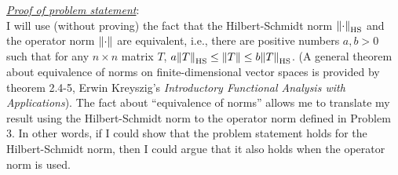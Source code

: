 \documentclass{article}
\begin{document}
























\noindent \underline{\textit{Proof of problem statement}}: \\


I will use (without proving) the fact that the Hilbert-Schmidt norm $\norm{ \cdot }_{\text{HS}}$ and the operator norm $\norm{\cdot}$ are equivalent, i.e., there are positive numbers $a,b> 0$ such that for any $n\times n$ matrix $T$, $a\norm{T}_{\text{HS}} \leq \norm{T} \leq b\norm{T}_{\text{HS}}$. (A general theorem about equivalence of norms on finite-dimensional vector spaces is provided by theorem 2.4-5, Erwin Kreyszig's \textit{Introductory Functional Analysis with Applications}). The fact about ``equivalence of norms'' allows me to translate my result using the Hilbert-Schmidt norm to the operator norm defined in Problem 3. In other words, if I could show that the problem statement holds for the Hilbert-Schmidt norm, then I could argue that it also holds when the operator norm is used.  
$\,$\\
\end{document}
